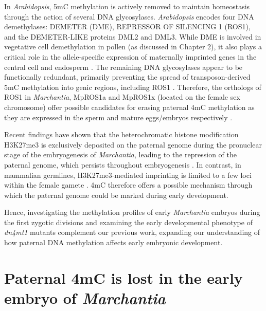 In \textit{Arabidopsis}, 5mC methylation is actively removed to maintain homeostasis through the action of several DNA glycosylases. \textit{Arabidopsis} encodes four DNA demethylases: DEMETER (DME), REPRESSOR OF SILENCING 1 (ROS1), and the DEMETER-LIKE proteins DML2 and DML3. While DME is involved in vegetative cell demethylation in pollen \cite{RN57} (as discussed in Chapter 2), it also plays a critical role in the allele-specific expression of maternally imprinted genes in the central cell and endosperm \cite{RN235}. The remaining DNA glycosylases appear to be functionally redundant, primarily preventing the spread of transposon-derived 5mC methylation into genic regions\cite{RN288}, including ROS1 \cite{RN168}. Therefore, the orthologs of ROS1 in \textit{Marchantia}, MpROS1a and MpROS1x (located on the female sex chromosome) offer possible candidates for erasing paternal 4mC methylation as they are expressed in the sperm \cite{RN212} and mature eggs/embryos \cite{RN257} respectively \cite{RN169,RN257,RN189}.

Recent findings have shown that the heterochromatic histone modification H3K27me3 is exclusively deposited on the paternal genome during the pronuclear stage of the embryogenesis of \textit{Marchantia}, leading to the repression of the paternal genome, which persists throughout embryogenesis \cite{RN160}. In contrast, in mammalian germlines, H3K27me3-mediated imprinting is limited to a few loci within the female gamete \cite{RN172}. 4mC therefore offers a possible mechanism through which the paternal genome could be marked during early development.

Hence, investigating the methylation profiles of early \textit{Marchantia} embryos during the first zygotic divisions and examining the early developmental phenotype of \textit{dn4mt1} mutants complement our previous work, expanding our understanding of how paternal DNA methylation affects early embryonic development.

\clearpage

\section{Paternal 4mC is lost in the early embryo of \textit{Marchantia}}

